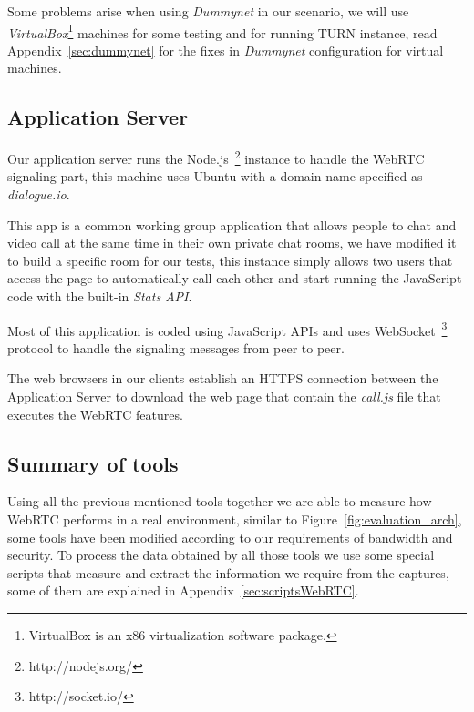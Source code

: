 Some problems arise when using {\it Dummynet} in our scenario, we will use {\it VirtualBox}\footnote{VirtualBox is an x86 virtualization software package.} machines for some testing and for running TURN instance, read Appendix~\ref{sec:dummynet} for the fixes in {\it Dummynet} configuration for virtual machines.

\subsection{Application Server}

Our application server runs the Node.js~\footnote{http://nodejs.org/} instance to handle the WebRTC signaling part, this machine uses Ubuntu with a domain name specified as {\it dialogue.io}. 

This app is a common working group application that allows people to chat and video call at the same time in their own private chat rooms, we have modified it to build a specific room for our tests, this instance simply allows two users that access the page to automatically call each other and start running the JavaScript code with the built-in {\it Stats API}.

Most of this application is coded using JavaScript APIs and uses WebSocket~\footnote{http://socket.io/} protocol to handle the signaling messages from peer to peer. 

The web browsers in our clients establish an HTTPS connection between the Application Server to download the web page that contain the {\it call.js} file that executes the WebRTC features.

\subsection{Summary of tools}

Using all the previous mentioned tools together we are able to measure how WebRTC performs in a real environment, similar to Figure~\ref{fig:evaluation_arch}, some tools have been modified according to our requirements of bandwidth and security. To process the data obtained by all those tools we use some special scripts that measure and extract the information we require from the captures, some of them are explained in Appendix~\ref{sec:scriptsWebRTC}.